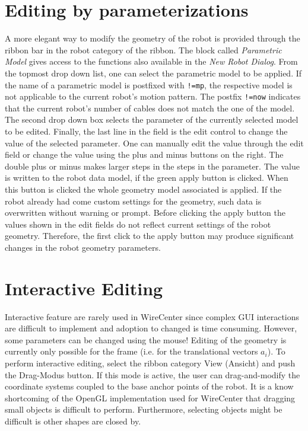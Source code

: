 \documentclass[11pt,a4paper,onepage,openany]{book}
\begin{document}
\section{Editing by parameterizations}
A more elegant way to modify the geometry of the robot is provided through the
ribbon bar in the robot category of the ribbon. The block called
\emph{Parametric Model} gives access to the functions also available in the
\emph{New Robot Dialog}. From the topmost drop down list, one can select the
parametric model to be applied. If the name of a parametric model is postfixed
with \texttt{!=mp}, the respective model is not applicable to the current
robot's motion pattern. The postfix \texttt{!=now} indicates that the current
robot's number of cables does not match the one of the model. The second drop
down box selects the parameter of the currently selected model to be edited.
Finally, the last line in the field is the edit control to change the value of
the selected parameter. One can manually edit the value through the edit field
or change the value using the plus and minus buttons on the right. The double
plus or minus makes larger steps in the steps in the parameter. The value is
written to the robot data model, if the green apply button is clicked. When
this button is clicked the whole geometry model associated is applied. If the
robot already had come custom settings for the geometry, such data is
overwritten without warning or prompt. Before clicking the apply button the
values shown in the edit fields do not reflect current settings of the robot
geometry. Therefore, the first click to the apply button may produce
significant changes in the robot geometry parameters.

\section{Interactive Editing}
Interactive feature are rarely used in WireCenter since complex GUI
interactions are difficult to implement and adoption to changed is time
consuming. However, some parameters can be changed using the mouse! Editing of
the geometry is currently only possible for the frame (i.e. for the
translational vectors $a_i$). To perform interactive editing, select the ribbon
category View (Ansicht) and push the Drag-Modus button. If this mode is active,
the user can drag-and-modify the coordinate systems coupled to the base anchor
points of the robot. It is a know shortcoming of the OpenGL implementation used
for WireCenter that dragging small objects is difficult to perform.
Furthermore, selecting objects might be difficult is other shapes are closed
by.
\end{document}
